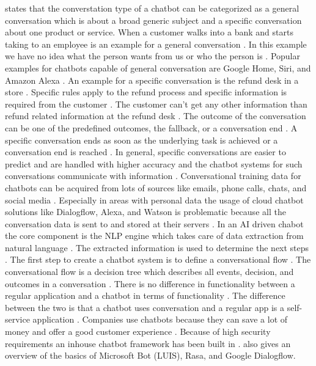 \documentclass[12pt, backref]{report}
\begin{document}
\citet{singhbuilding} states that the converstation type of a chatbot can be categorized as a general conversation which is about a broad generic subject and a specific conversation about one product or service.
When a customer walks into a bank and starts taking to an employee is an example for a general conversation \cite{singhbuilding}.
In this example we have no idea what the person wants from us or who the person is \cite{singhbuilding}.
Popular examples for chatbots capable of general conversation are Google Home, Siri, and Amazon Alexa \cite{singhbuilding}.
An example for a specific conversation is the refund desk in a store \cite{singhbuilding}. Specific rules apply to the refund process and specific information is required from the customer \cite{singhbuilding}. The customer can't get any other information than refund related information at the refund desk \cite{singhbuilding}. The outcome of the conversation can be one of the predefined outcomes, the fallback, or a conversation end \cite{singhbuilding}. A specific conversation ends as soon as the underlying task is achieved or a conversation end is reached \cite{singhbuilding}. In general, specific conversations are easier to predict and are handled with higher accuracy and the chatbot systems for such conversations communicate with information \cite{singhbuilding}. 
Conversational training data for chatbots can be acquired from lots of sources like emails, phone calls, chats, and social media \cite{singhbuilding}.
Especially in areas with personal data the usage of cloud chatbot solutions like Dialogflow, Alexa, and Watson is problematic because all the conversation data is sent to and stored at their servers \cite{singhbuilding}.
In an AI driven chabot the core component is the NLP engine which takes care of data extraction from natural language \cite{singhbuilding}. The extracted information is used to determine the next steps \cite{singhbuilding}.
The first step to create a chatbot system is to define a conversational flow \cite{singhbuilding}.
The conversational flow is a decision tree which describes all events, decision, and outcomes in a conversation \cite{singhbuilding}.
There is no difference in functionality between a regular application and a chatbot in terms of functionality \cite{singhbuilding}. The difference between the two is that a chatbot uses conversation and a regular app is a self-service application \cite{singhbuilding}. Companies use chatbots because they can save a lot of money and offer a good customer experience \cite{singhbuilding}.
Because of high security requirements an inhouse chatbot framework has been built in \citet{singhbuilding}.
\citet{singhbuilding} also gives an overview of the basics of Microsoft Bot (LUIS), Rasa, and Google Dialogflow.
\end{document}
